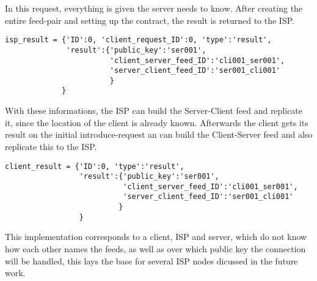 In this request, everything is given the server needs to know. After creating the entire feed-pair and setting up the contract, the result is returned to the ISP.
\\
\begin{lstlisting}
isp_result = {'ID':0, 'client_request_ID':0, 'type':'result', 
              'result':{'public_key':'ser001', 
                        'client_server_feed_ID':'cli001_ser001',
                        'server_client_feed_ID':'ser001_cli001'
                        }
             }
\end{lstlisting}
With these informations, the ISP can build the Server-Client feed and replicate it, since the location of the client is already known.
Afterwards the client gets its result on the initial introduce-request an can build the Client-Server feed and also replicate this to the ISP.\\
\begin{lstlisting}
client_result = {'ID':0, 'type':'result', 
                 'result':{'public_key':'ser001', 
                           'client_server_feed_ID':'cli001_ser001', 
                           'server_client_feed_ID':'ser001_cli001'
                          }
                 }
\end{lstlisting}
This implementation corresponds to a client, ISP and server, which do not know how each other names the feeds, as well as over which public key the connection will be handled, this lays the base for several ISP nodes dicussed in the future work. 

